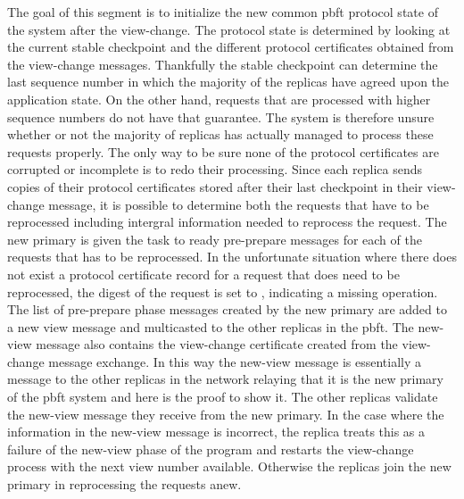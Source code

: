 \iffalse
The goal of this segment is to initialize the new common \ac{pbft} protocol state of the system after the view-change. The protocol state is determined by looking at the current stable checkpoint and the different protocol certificates obtained from the view-change messages. Thankfully the stable checkpoint can determine the last sequence number in which the majority of the replicas have agreed upon the application state. On the other hand, requests that are processed with higher sequence numbers do not have that guarantee. The system is therefore unsure whether or not the majority of replicas has actually managed to process these requests properly. The only way to be sure none of the protocol certificates are corrupted or incomplete is to redo their processing. Since each replica sends copies of their protocol certificates stored after their last checkpoint in their view-change message,  it is possible to determine both the requests that have to be reprocessed including intergral information needed to reprocess the request. The new primary is given the task to ready pre-prepare messages for each of the requests that has to be reprocessed. In the unfortunate situation where there does not exist a protocol certificate record for a request that does need to be reprocessed, the digest of the request is set to , indicating a missing operation. The list of pre-prepare phase messages created by the new primary are added to a new view message and multicasted to the other replicas in the \ac{pbft}. The new-view message also contains the view-change certificate created from the view-change message exchange. In this way the new-view message is essentially a message to the other replicas in the network relaying that it is the new primary of the \ac{pbft} system and here is the proof to show it. The other replicas validate the new-view message they receive from the new primary. In the case where the information in the new-view message is incorrect, the replica treats this as a failure of the new-view phase of the program and restarts the view-change process with the next view number available. Otherwise the replicas join the new primary in reprocessing the requests anew. 

